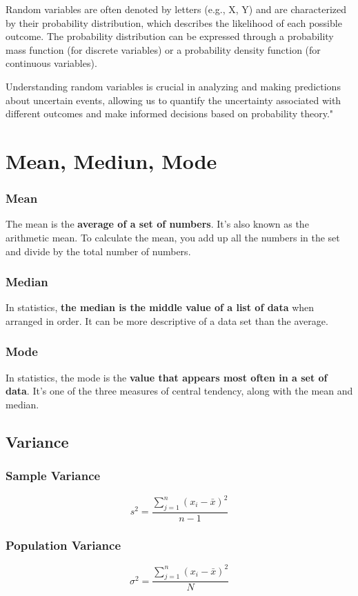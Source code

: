 \documentclass[12pt]{book}
\begin{document}
Random variables are often denoted by letters (e.g., X, Y) and are characterized by their probability distribution, which describes the likelihood of each possible outcome. The probability distribution can be expressed through a probability mass function (for discrete variables) or a probability density function (for continuous variables).

Understanding random variables is crucial in analyzing and making predictions about uncertain events, allowing us to quantify the uncertainty associated with different outcomes and make informed decisions based on probability theory."

\section{Mean, Mediun, Mode}

\subsubsection*{Mean}
The mean is the \textbf{average of a set of numbers}. It's also known as the arithmetic mean. To calculate the mean, you add up all the numbers in the set and divide by the total number of numbers.

\subsubsection*{Median}
In statistics, \textbf {the median is the middle value of a list of data} when arranged in order. It can be more descriptive of a data set than the average.

\subsubsection*{Mode}
In statistics, the mode is the \textbf {value that appears most often in a set of data}. It's one of the three measures of central tendency, along with the mean and median.

\subsection*{Variance}
\subsubsection*{Sample Variance}
\[
    s^2 = \frac{\sum_{j=1}^n (x_i - \bar x)^2}{n-1}
\]

\subsubsection*{Population Variance}
\[
    \sigma^2= \frac{\sum_{j=1}^n (x_i - \bar x)^2}{N}
\]
\end{document}
